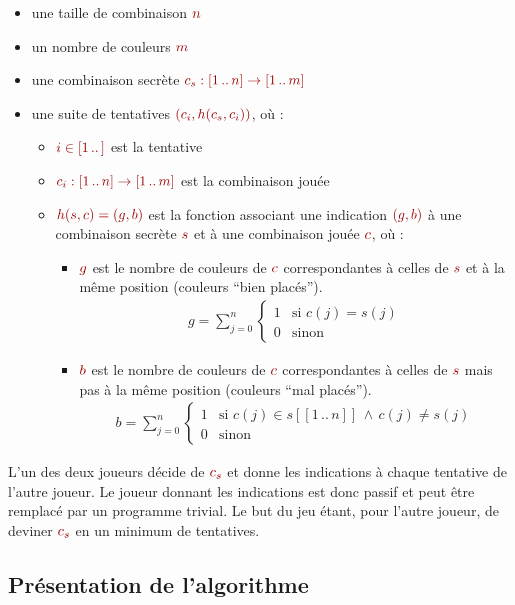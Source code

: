 \documentclass[a4paper]{article}
\newcommand{\isep}{\,..\,}
\renewcommand{\(}{\begin{math}\color{brick}}
\renewcommand{\)}{\end{math}}
\newcommand{\blockmath}[1]{{\color{brick}\begin{align*}#1\end{align*}}}
\newcommand{\lnd}{\,\land\,}
\begin{document}
\begin{itemize}
\item une taille de combinaison \(n\)
\item un nombre de couleurs \(m\)
\item une combinaison secrète \(c_s : [1 \isep n] \rightarrow [1 \isep m]\)
\item une suite de tentatives \((c_i, h(c_s,c_i))\), où :
  \begin{itemize}
  \item \(i \in [1 \isep ]\) est la tentative
  \item \(c_i : [1 \isep n] \rightarrow [1 \isep m]\) est la combinaison jouée
  \item \(h(s,c) = (g,b)\) est la fonction associant une indication \((g,b)\) à une combinaison secrète \(s\) et à une combinaison jouée \(c\), où :
    \begin{itemize}
    \item \(g\) est le nombre de couleurs de \(c\) correspondantes
      à celles de \(s\) et à la même position (couleurs ``bien
      placés'').
      \blockmath{
        g = \sum_{j=0}^{n}
        \begin{cases}
          1 & \text{si } c(j)=s(j) \\
          0 & \text{sinon}
        \end{cases}
      }
    \item \(b\) est le nombre de couleurs de \(c\) correspondantes
      à celles de \(s\) mais pas à la même position (couleurs ``mal
      placés'').
      \blockmath{
        b = \sum_{j=0}^{n}
        \begin{cases}
          1 & \text{si } c(j) \in s[[1 \isep n]] \lnd c(j) \neq s(j) \\
          0 & \text{sinon}
        \end{cases}
      }
    \end{itemize}
  \end{itemize}
\end{itemize}

L'un des deux joueurs décide de \(c_s\) et donne les indications à
chaque tentative de l'autre joueur. Le joueur donnant les indications est
donc passif et peut être remplacé par un programme trivial. Le but du
jeu étant, pour l'autre joueur, de deviner \(c_s\) en un minimum de
tentatives.

\subsection{Présentation de l'algorithme}
\end{document}
